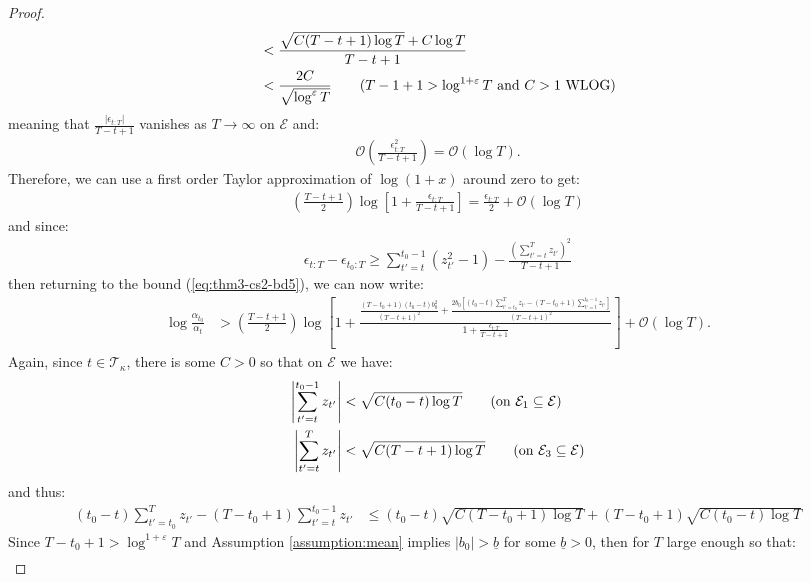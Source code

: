\begin{proof}
\begin{align*}
    &<\frac{\sqrt{C(T-t+1)\log T} + C\log T}{T-t+1} \\
    &< \frac{2C}{\sqrt{\log^{\varepsilon}T}} \tag{$T-1+1 > \log^{1+\varepsilon} T$ and $C > 1$ WLOG}
\end{align*}
meaning that $\frac{|\epsilon_{t:T}|}{T-t+1}$ vanishes as $T\to\infty$ on $\mathcal{E}$ and:
\begin{align*}
     \mathcal{O}\left(\frac{\epsilon_{t:T}^2}{T-t+1}\right) = \mathcal{O}\left(\log T\right).
\end{align*}
Therefore, we can use a first order Taylor approximation of $\log(1+x)$ around zero to get: 
\begin{align*}
    \left(\frac{T - t +1}{2}\right)\log\left[1 + \frac{\epsilon_{t:T}}{T-t+1}\right] = \frac{\epsilon_{t:T}}{2} + \mathcal{O}\left(\log T\right)
\end{align*}
and since:
\begin{align*}
    \epsilon_{t:T} - \epsilon_{t_0:T} \geq \sum_{t' = t}^{t_0 - 1} (z_{t'}^2-1) - \frac{\left(\sum_{t'=t}^T z_{t'}\right)^2}{T-t+1}
\end{align*}
then returning to the bound (\ref{eq:thm3-cs2-bd5}), we can now write:
\begin{align}
    \log \frac{\alpha_{t_0}}{\alpha_t} &> \left(\frac{T - t +1}{2}\right)\log\left[1 +\frac{\frac{(T-t_0+1)(t_0-t)b_0^2}{(T-t+1)^2} + \frac{2b_0\left[(t_0-t)\sum_{t'=t_0}^{T} z_{t'} - (T-t_0+1)\sum_{t'=t}^{t_0-1} z_{t'}\right]}{(T-t+1)^2}}{1 + \frac{\epsilon_{t:T}}{T-t+1}} \right]   + \mathcal{O}(\log T). \label{eq:thm3-cs2-bd6}
\end{align}
Again, since $t\in\mathcal{T}_\kappa$, there is some $C>0$ so that on $\mathcal{E}$ we have:
\begin{align*}
    \left|\sum_{t'=t}^{t_0-1} z_{t'}\right| &< \sqrt{C(t_0-t)\log T} \tag{on $\mathcal{E}_1 \subseteq \mathcal{E}$} \\
    \left|\sum_{t'=t}^{T} z_{t'} \right|&< \sqrt{C(T-t+1)\log T} \tag{on $\mathcal{E}_3 \subseteq \mathcal{E}$}
\end{align*}
and thus:
\begin{align*}
    (t_0-t)\sum_{t'=t_0}^{T} z_{t'} - (T-t_0+1)\sum_{t'=t}^{t_0-1} z_{t'} &\leq (t_0-t)\sqrt{C(T-t_0+1)\log T} + (T-t_0+1)\sqrt{C(t_0-t)\log T}
\end{align*}
Since $T-t_0+1 > \log^{1+\varepsilon} T$ and Assumption \ref{assumption:mean} implies $|b_0| > \underline{b}$ for some $\underline{b} > 0$, then for $T$ large enough so that:
\begin{align*}

\end{align*}
\end{proof}
